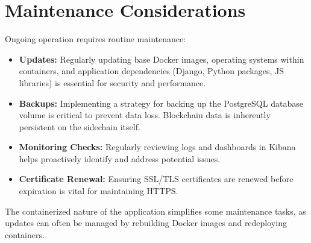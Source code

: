 \section{Maintenance Considerations}
\label{sec:maintenance}
Ongoing operation requires routine maintenance:
\begin{itemize}
    \item \textbf{Updates:} Regularly updating base Docker images, operating systems within containers, and application dependencies (Django, Python packages, JS libraries) is essential for security and performance.
    \item \textbf{Backups:} Implementing a strategy for backing up the PostgreSQL database volume is critical to prevent data loss. Blockchain data is inherently persistent on the sidechain itself.
    \item \textbf{Monitoring Checks:} Regularly reviewing logs and dashboards in Kibana helps proactively identify and address potential issues.
    \item \textbf{Certificate Renewal:} Ensuring SSL/TLS certificates are renewed before expiration is vital for maintaining HTTPS.
\end{itemize}
The containerized nature of the application simplifies some maintenance tasks, as updates can often be managed by rebuilding Docker images and redeploying containers.
